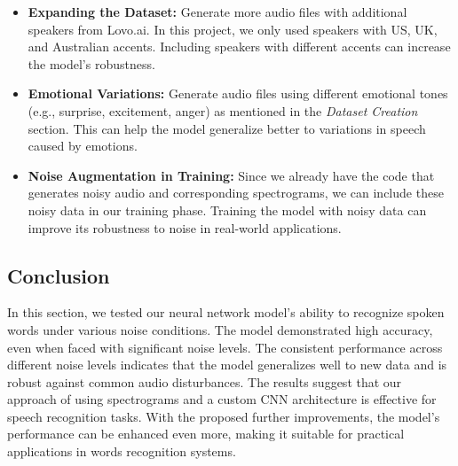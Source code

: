 \documentclass[12pt]{article}
\begin{document}
\begin{itemize}
    \item \textbf{Expanding the Dataset:} Generate more audio files with additional speakers from Lovo.ai. In this project, we only used speakers with US, UK, and Australian accents. Including speakers with different accents can increase the model's robustness.

    \item \textbf{Emotional Variations:} Generate audio files using different emotional tones (e.g., surprise, excitement, anger) as mentioned in the \textit{Dataset Creation} section. This can help the model generalize better to variations in speech caused by emotions.

    \item \textbf{Noise Augmentation in Training:} Since we already have the code that generates noisy audio and corresponding spectrograms, we can include these noisy data in our training phase. Training the model with noisy data can improve its robustness to noise in real-world applications.
\end{itemize}

\subsection{Conclusion}

In this section, we tested our neural network model's ability to recognize spoken words under various noise conditions. The model demonstrated high accuracy, even when faced with significant noise levels. The consistent performance across different noise levels indicates that the model generalizes well to new data and is robust against common audio disturbances. The results suggest that our approach of using spectrograms and a custom CNN architecture is effective for speech recognition tasks. With the proposed further improvements, the model's performance can be enhanced even more, making it suitable for practical applications in words recognition systems.

\end{document}
